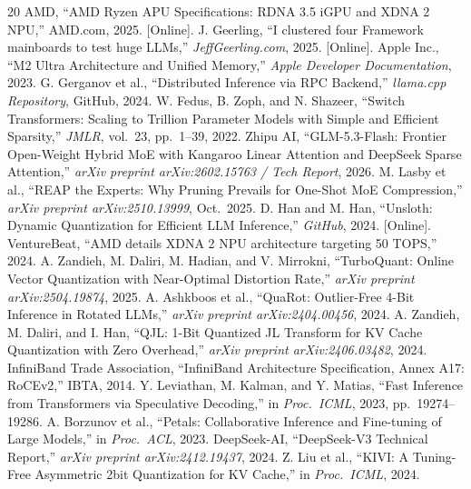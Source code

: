 \documentclass[11pt,a4paper]{article}
\begin{document}
\vspace{1cm}
\begin{thebibliography}{20}
 AMD, ``AMD Ryzen APU Specifications: RDNA 3.5 iGPU and XDNA 2 NPU,'' AMD.com, 2025. [Online].
 J. Geerling, ``I clustered four Framework mainboards to test huge LLMs,'' \textit{JeffGeerling.com}, 2025. [Online].
 Apple Inc., ``M2 Ultra Architecture and Unified Memory,'' \textit{Apple Developer Documentation}, 2023.
 G. Gerganov et al., ``Distributed Inference via RPC Backend,'' \textit{llama.cpp Repository}, GitHub, 2024.
 W. Fedus, B. Zoph, and N. Shazeer, ``Switch Transformers: Scaling to Trillion Parameter Models with Simple and Efficient Sparsity,'' \textit{JMLR}, vol.~23, pp.~1--39, 2022.
 Zhipu AI, ``GLM-5.3-Flash: Frontier Open-Weight Hybrid MoE with Kangaroo Linear Attention and DeepSeek Sparse Attention,'' \textit{arXiv preprint arXiv:2602.15763 / Tech Report}, 2026.
 M. Lasby et al., ``REAP the Experts: Why Pruning Prevails for One-Shot MoE Compression,'' \textit{arXiv preprint arXiv:2510.13999}, Oct.~2025.
 D. Han and M. Han, ``Unsloth: Dynamic Quantization for Efficient LLM Inference,'' \textit{GitHub}, 2024. [Online].
 VentureBeat, ``AMD details XDNA 2 NPU architecture targeting 50 TOPS,'' 2024.
 A. Zandieh, M. Daliri, M. Hadian, and V. Mirrokni, ``TurboQuant: Online Vector Quantization with Near-Optimal Distortion Rate,'' \textit{arXiv preprint arXiv:2504.19874}, 2025.
 A. Ashkboos et al., ``QuaRot: Outlier-Free 4-Bit Inference in Rotated LLMs,'' \textit{arXiv preprint arXiv:2404.00456}, 2024.
 A. Zandieh, M. Daliri, and I. Han, ``QJL: 1-Bit Quantized JL Transform for KV Cache Quantization with Zero Overhead,'' \textit{arXiv preprint arXiv:2406.03482}, 2024.
 InfiniBand Trade Association, ``InfiniBand Architecture Specification, Annex A17: RoCEv2,'' IBTA, 2014.
 Y. Leviathan, M. Kalman, and Y. Matias, ``Fast Inference from Transformers via Speculative Decoding,'' in \textit{Proc.\ ICML}, 2023, pp.~19274--19286.
 A. Borzunov et al., ``Petals: Collaborative Inference and Fine-tuning of Large Models,'' in \textit{Proc.\ ACL}, 2023.
 DeepSeek-AI, ``DeepSeek-V3 Technical Report,'' \textit{arXiv preprint arXiv:2412.19437}, 2024.
 Z. Liu et al., ``KIVI: A Tuning-Free Asymmetric 2bit Quantization for KV Cache,'' in \textit{Proc.\ ICML}, 2024.

\end{thebibliography}
\end{document}
